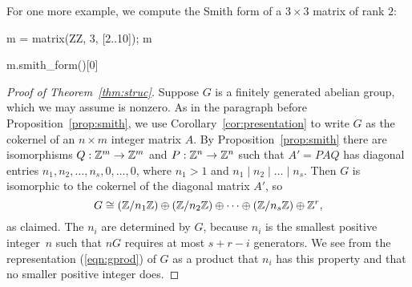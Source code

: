 \begin{example}
For one more example, we compute the Smith form of a
$3\times 3$ matrix of rank $2$:
\begin{sagecode}
\begin{sagecell}
m = matrix(ZZ, 3, [2..10]); m
\end{sagecell}
\begin{sageout}
[ 2  3  4]
[ 5  6  7]
[ 8  9 10]
\end{sageout}
\begin{sagecell}
m.smith_form()[0]
\end{sagecell}
\begin{sageout}
[1 0 0]
[0 3 0]
[0 0 0]
\end{sageout}
\end{sagecode}
\end{example}


\begin{proof}[Proof of Theorem~\ref{thm:struc}]
	Suppose $G$ is a finitely generated abelian group, which we may assume
	is nonzero.  As in the paragraph before Proposition~\ref{prop:smith},
	we use Corollary~\ref{cor:presentation} to write $G$ as the cokernel
	of an $n\times m$ integer matrix $A$.  By Proposition~\ref{prop:smith}
	there are isomorphisms $Q:\mathbb{Z}^m\to \mathbb{Z}^m$ and $P:\mathbb{Z}^n\to \mathbb{Z}^n$ such that
	$A'=PAQ$ has diagonal entries $n_1, n_2,\ldots,
	n_s,0,\ldots,0$, where $n_1>1$ and $n_1\mid n_2 \mid{} \ldots \mid{}
	n_s$.  Then $G$ is isomorphic to the cokernel of the diagonal matrix
	$A'$, so
	\begin{equation}\label{eqn:gprod}
		G \cong (\mathbb{Z}/n_1\mathbb{Z}) \oplus (\mathbb{Z}/n_2\mathbb{Z})
		\oplus \cdots \oplus (\mathbb{Z}/n_s\mathbb{Z}) \oplus \mathbb{Z}^{r},
	\end{equation}
	as claimed.  The $n_i$ are determined by $G$, because $n_i$ is the
	smallest positive integer~$n$ such that $nG$ requires at most $s+r-i$
	generators. We see from the representation (\ref{eqn:gprod}) of $G$ as
	a product that $n_i$ has this property and that no smaller positive
	integer does.
\end{proof}

